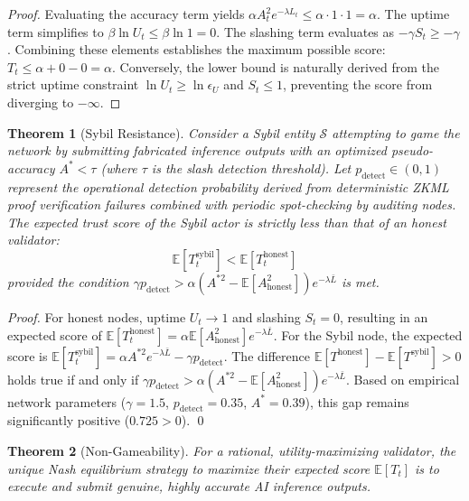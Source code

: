 \documentclass[journal]{IEEEtran}
\newtheorem{theorem}{Theorem}
\begin{document}
\begin{proof}
Evaluating the accuracy term yields $\alpha A_t^2 e^{-\lambda L_t} \leq \alpha \cdot 1 \cdot 1 = \alpha$. The uptime term simplifies to $\beta \ln U_t \leq \beta \ln 1 = 0$. The slashing term evaluates as $-\gamma S_t \geq -\gamma$. Combining these elements establishes the maximum possible score: $T_t \leq \alpha + 0 - 0 = \alpha$. Conversely, the lower bound is naturally derived from the strict uptime constraint $\ln U_t \geq \ln \epsilon_U$ and $S_t \leq 1$, preventing the score from diverging to $-\infty$.
\end{proof}

\begin{theorem}[Sybil Resistance]
\label{thm:sybil}
Consider a Sybil entity $\mathcal{S}$ attempting to game the network by submitting fabricated inference outputs with an optimized pseudo-accuracy $A^* < \tau$ (where $\tau$ is the slash detection threshold). Let $p_{\text{detect}} \in (0,1)$ represent the operational detection probability derived from deterministic ZKML proof verification failures combined with periodic spot-checking by auditing nodes. The expected trust score of the Sybil actor is strictly less than that of an honest validator:
\begin{equation}
  \mathbb{E}[T_t^{\text{sybil}}] < \mathbb{E}[T_t^{\text{honest}}]
\end{equation}
provided the condition $\gamma p_{\text{detect}} > \alpha (A^{*2} - \mathbb{E}[A_{\text{honest}}^2]) e^{-\lambda \bar{L}}$ is met.
\end{theorem}

\begin{proof}
For honest nodes, uptime $U_t \to 1$ and slashing $S_t = 0$, resulting in an expected score of $\mathbb{E}[T_t^{\text{honest}}] = \alpha \mathbb{E}[A_{\text{honest}}^2] e^{-\lambda \bar{L}}$. For the Sybil node, the expected score is $\mathbb{E}[T_t^{\text{sybil}}] = \alpha A^{*2} e^{-\lambda \bar{L}} - \gamma p_{\text{detect}}$. The difference $\mathbb{E}[T^{\text{honest}}] - \mathbb{E}[T^{\text{sybil}}] > 0$ holds true if and only if $\gamma p_{\text{detect}} > \alpha(A^{*2} - \mathbb{E}[A_{\text{honest}}^2])e^{-\lambda \bar{L}}$. Based on empirical network parameters ($\gamma = 1.5$, $p_{\text{detect}} = 0.35$, $A^* = 0.39$), this gap remains significantly positive ($0.725 > 0$). \qed
\end{proof}

\begin{theorem}[Non-Gameability]
\label{thm:game}
For a rational, utility-maximizing validator, the unique Nash equilibrium strategy to maximize their expected score $\mathbb{E}[T_t]$ is to execute and submit genuine, highly accurate AI inference outputs.
\end{theorem}
\end{document}
